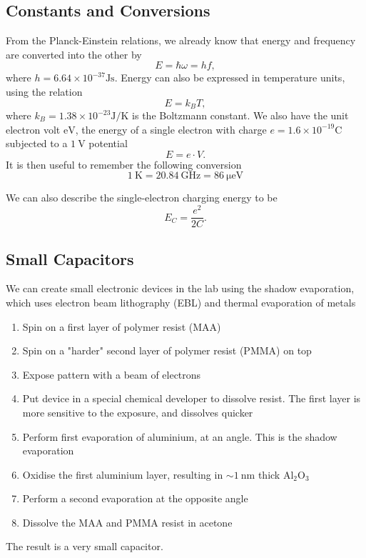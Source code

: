 \documentclass{article}
\begin{document}
\subsection{Constants and Conversions}
From the Planck-Einstein relations, we already know that energy and frequency are converted into the other by 
\[
    E=\hbar\omega =hf,
\]
where $h=6.64\times 10^{-37}\unit{\joule\second}$. Energy can also be expressed in temperature units, using the relation 
\[
    E=k_B T,
\]
where $k_B=1.38 \times 10^{-23} \unit{\joule\per\kelvin}$ is the Boltzmann constant. We also have the unit electron volt $\unit{\electronvolt}$, the energy of a single electron with charge $e=1.6\times 10^{-19}\unit{\coulomb}$ subjected to a $\SI{1}{\volt}$ potential 
\[
    E=e\cdot V.
\]
It is then useful to remember the following conversion 
\[
    \boxed{\SI{1}{\kelvin}=\SI{20.84}{\giga\hertz}=\SI{86}{\micro\electronvolt}}
\]

We can also describe the single-electron charging energy to be 
\[
    E_C=\frac{e^2}{2C}.
\]

\subsection{Small Capacitors}
We can create small electronic devices in the lab using the shadow evaporation, which uses electron beam lithography (EBL) and thermal evaporation of metals
\begin{enumerate}
    \item Spin on a first layer of polymer resist (MAA)
    \item Spin on a "harder" second layer of polymer resist (PMMA) on top
    \item Expose pattern with a beam of electrons
    \item Put device in a special chemical developer to dissolve resist. The first layer is more sensitive to the exposure, and dissolves quicker
    \item Perform first evaporation of aluminium, at an angle. This is the shadow evaporation
    \item Oxidise the first aluminium layer, resulting in $\sim \SI{1}{\nano\metre}$ thick $\text{Al}_2 \text{O}_3$
    \item Perform a second evaporation at the opposite angle
    \item Dissolve the MAA and PMMA resist in acetone
\end{enumerate}
The result is a very small capacitor.
\end{document}
